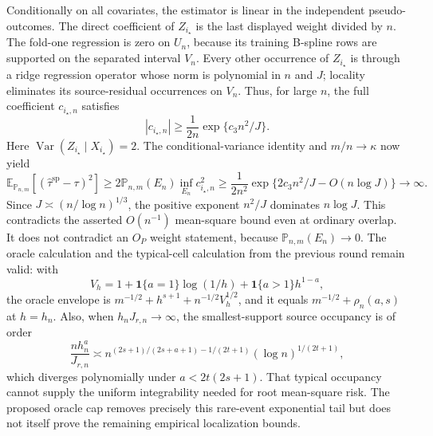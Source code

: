 Conditionally on all covariates, the estimator is linear in the independent pseudo-outcomes. The direct coefficient of \(Z_{i_\star}\) is the last displayed weight divided by \(n\). The fold-one regression is zero on \(U_n\), because its training B-spline rows are supported on the separated interval \(V_n\). Every other occurrence of \(Z_{i_\star}\) is through a ridge regression operator whose norm is polynomial in \(n\) and \(J\); locality eliminates its source-residual occurrences on \(V_n\). Thus, for large \(n\), the full coefficient \(c_{i_\star,n}\) satisfies
\[
 |c_{i_\star,n}|\ge \frac1{2n}\exp\{c_3n^2/J\}.
\]
Here \(\operatorname{Var}(Z_{i_\star}\mid X_{i_\star})=2\). The conditional-variance identity and \(m/n\to\kappa\) now yield
\[
 \mathbb E_{\mathbb P_{n,m}}[(\widehat\tau^{\mathrm{sp}}-\tau)^2]
 \ge 2\mathbb P_{n,m}(E_n)\inf_{E_n}c_{i_\star,n}^2
 \ge \frac1{2n^2}\exp\{2c_3n^2/J-O(n\log J)\}\longrightarrow\infty.
\]
Since \(J\asymp(n/\log n)^{1/3}\), the positive exponent \(n^2/J\) dominates \(n\log J\). This contradicts the asserted \(O(n^{-1})\) mean-square bound even at ordinary overlap. It does not contradict an \(O_P\) weight statement, because \(\mathbb P_{n,m}(E_n)\to0\). The oracle calculation and the typical-cell calculation from the previous round remain valid: with
\[
 V_h=1+\mathbf 1\{a=1\}\log(1/h)+\mathbf 1\{a>1\}h^{1-a},
\]
the oracle envelope is \(m^{-1/2}+h^{s+1}+n^{-1/2}V_h^{1/2}\), and it equals \(m^{-1/2}+\rho_n(a,s)\) at \(h=h_n\). Also, when \(h_nJ_{r,n}\to\infty\), the smallest-support source occupancy is of order
\[
 \frac{nh_n^a}{J_{r,n}}
 \asymp n^{(2s+1)/(2s+a+1)-1/(2t+1)}(\log n)^{1/(2t+1)},
\]
which diverges polynomially under \(a<2t(2s+1)\). That typical occupancy cannot supply the uniform integrability needed for root mean-square risk. The proposed oracle cap removes precisely this rare-event exponential tail but does not itself prove the remaining empirical localization bounds.